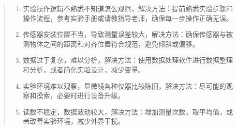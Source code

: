 \documentclass[11pt]{article}
\begin{document}
\begin{enumerate}
\begin{quote}
    \begin{enumerate}
        \item 实验操作逻辑不熟悉不知道怎么观察，解决方法：提前熟悉实验步骤和操作流程，参考实验手册或请教指导老师，确保每一步操作正确无误。
        \item 传感器安装位置不当，导致测量误差较大，解决方法：确保传感器与被测物体之间的距离和对齐位置符合规范，避免倾斜或偏移。
        \item 数据过于复杂，难以分析，解决方法：使用数据处理软件进行数据整理和分析，或者简化实验设计，减少变量。
        \item 实验环境难以观察，显微镜各种仪器比较陈旧，解决方法：尽可能的观察和摸索，必要时进行设备升级。
        \item 读数不稳定，数据波动较大，解决方法：增加测量次数，取平均值，或者改善实验环境，减少外界干扰。
    \end{enumerate}
    \end{quote}

\end{enumerate}
\end{document}
